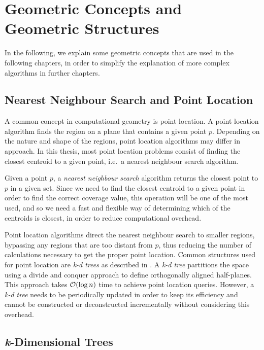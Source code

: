 \section{Geometric Concepts and Geometric Structures}
In the following, we explain some geometric concepts that are used in the following chapters, in order to simplify the explanation of more complex algorithms in further chapters.
\subsection{Nearest Neighbour Search and Point Location}
A common concept in computational geometry is point location. A point location algorithm finds the region on a plane that contains a given point $p$. Depending on the nature and shape of the regions, point location algorithms may differ in approach. In this thesis, most point location problems consist of finding the closest centroid to a given point, i.e.\ a nearest neighbour search algorithm.

Given a point $p$, a \emph{nearest neighbour search} algorithm returns the closest point to $p$ in a given set. Since we need to find the closest centroid to a given point in order to find the correct coverage value, this operation will be one of the most used, and  so we need a fast and flexible way of determining which of the centroids is closest, in order to reduce computational overhead. 

Point location algorithms direct the nearest neighbour search to smaller regions, bypassing any regions that are too distant from $p$, thus reducing the number of calculations necessary to get the proper point location.
Common structures used for point location are \emph{k-d trees} as described in \citet{incrementalcov}. A \emph{k-d tree} partitions the space using a divide and conquer approach to define orthogonally aligned half-planes. This approach takes $\mathcal{O}(\log{n})$ time to achieve point location queries. However, a \emph{k-d tree} needs to be periodically updated in order to keep its efficiency and cannot be constructed or deconstructed incrementally without considering this overhead.
\subsection{\textit{k}-Dimensional Trees}

